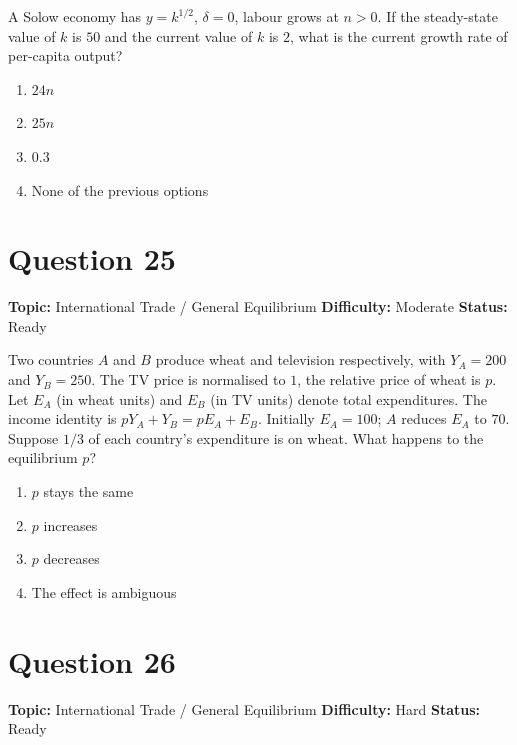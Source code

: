 \documentclass[11pt]{article}
\begin{document}
A Solow economy has $y=k^{1/2}$, $\delta=0$, labour grows at $n>0$. If the steady-state value of $k$ is $50$ and the current value of $k$ is $2$, what is the current growth rate of per-capita output?
\begin{enumerate}[label=(\Alph*)]
\item $24n$
\item $25n$
\item $0.3$
\item None of the previous options
\end{enumerate}

\newpage

\section*{Question 25}


\noindent\textbf{Topic:} International Trade / General Equilibrium \quad \textbf{Difficulty:} Moderate \quad \textbf{Status:} Ready



Two countries $A$ and $B$ produce wheat and television respectively, with $Y_A=200$ and $Y_B=250$. The TV price is normalised to $1$, the relative price of wheat is $p$. Let $E_A$ (in wheat units) and $E_B$ (in TV units) denote total expenditures. The income identity is $pY_A+Y_B=pE_A+E_B$. Initially $E_A=100$; $A$ reduces $E_A$ to $70$. Suppose $1/3$ of each country's expenditure is on wheat. What happens to the equilibrium $p$?
\begin{enumerate}[label=(\Alph*)]
\item $p$ stays the same
\item $p$ increases
\item $p$ decreases
\item The effect is ambiguous
\end{enumerate}

\newpage

\section*{Question 26}


\noindent\textbf{Topic:} International Trade / General Equilibrium \quad \textbf{Difficulty:} Hard \quad \textbf{Status:} Ready
\end{document}
